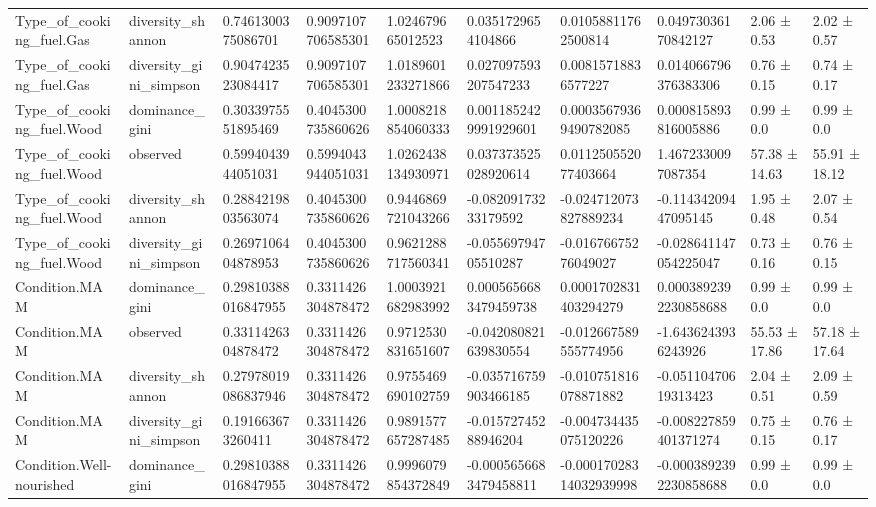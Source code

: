 \begin{longtable}{llllllllll}
Type\_of\_cooking\_fuel.Gas & diversity\_shannon & 0.7461300375086701 & 0.9097107706585301 & 1.024679665012523 & 0.0351729654104866 & 0.01058811762500814 & 0.04973036170842127 & 2.06 ± 0.53 & 2.02 ± 0.57 \\
Type\_of\_cooking\_fuel.Gas & diversity\_gini\_simpson & 0.9047423523084417 & 0.9097107706585301 & 1.0189601233271866 & 0.027097593207547233 & 0.00815718836577227 & 0.014066796376383306 & 0.76 ± 0.15 & 0.74 ± 0.17 \\
Type\_of\_cooking\_fuel.Wood & dominance\_gini & 0.3033975551895469 & 0.4045300735860626 & 1.0008218854060333 & 0.0011852429991929601 & 0.00035679369490782085 & 0.000815893816005886 & 0.99 ± 0.0 & 0.99 ± 0.0 \\
Type\_of\_cooking\_fuel.Wood & observed & 0.5994043944051031 & 0.5994043944051031 & 1.0262438134930971 & 0.037373525028920614 & 0.011250552077403664 & 1.4672330097087354 & 57.38 ± 14.63 & 55.91 ± 18.12 \\
Type\_of\_cooking\_fuel.Wood & diversity\_shannon & 0.2884219803563074 & 0.4045300735860626 & 0.9446869721043266 & -0.08209173233179592 & -0.024712073827889234 & -0.11434209447095145 & 1.95 ± 0.48 & 2.07 ± 0.54 \\
Type\_of\_cooking\_fuel.Wood & diversity\_gini\_simpson & 0.2697106404878953 & 0.4045300735860626 & 0.9621288717560341 & -0.05569794705510287 & -0.01676675276049027 & -0.028641147054225047 & 0.73 ± 0.16 & 0.76 ± 0.15 \\
Condition.MAM & dominance\_gini & 0.29810388016847955 & 0.3311426304878472 & 1.0003921682983992 & 0.0005656683479459738 & 0.0001702831403294279 & 0.0003892392230858688 & 0.99 ± 0.0 & 0.99 ± 0.0 \\
Condition.MAM & observed & 0.3311426304878472 & 0.3311426304878472 & 0.9712530831651607 & -0.042080821639830554 & -0.012667589555774956 & -1.6436243936243926 & 55.53 ± 17.86 & 57.18 ± 17.64 \\
Condition.MAM & diversity\_shannon & 0.27978019086837946 & 0.3311426304878472 & 0.9755469690102759 & -0.035716759903466185 & -0.010751816078871882 & -0.05110470619313423 & 2.04 ± 0.51 & 2.09 ± 0.59 \\
Condition.MAM & diversity\_gini\_simpson & 0.191663673260411 & 0.3311426304878472 & 0.9891577657287485 & -0.01572745288946204 & -0.004734435075120226 & -0.008227859401371274 & 0.75 ± 0.15 & 0.76 ± 0.17 \\
Condition.Well-nourished & dominance\_gini & 0.29810388016847955 & 0.3311426304878472 & 0.9996079854372849 & -0.0005656683479458811 & -0.00017028314032939998 & -0.0003892392230858688 & 0.99 ± 0.0 & 0.99 ± 0.0 \\

\end{longtable}
